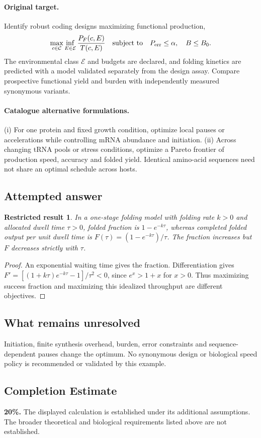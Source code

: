 \documentclass[11pt]{article}
\newtheorem{attemptresult}{Restricted result}[section]
\begin{document}
\paragraph{Original target.}
Identify robust coding designs maximizing functional production,
\[\max_{c\in\mathcal C}\inf_{E\in\mathcal E}\frac{P_F(c,E)}{T(c,E)}\quad\text{subject to}\quad P_{\rm err}\le\alpha,\quad B\le B_0.\]
The environmental class $\mathcal E$ and budgets are declared, and folding kinetics are predicted with a model validated separately from the design assay. Compare prospective functional yield and burden with independently measured synonymous variants.
\paragraph{Catalogue alternative formulations.}
(i) For one protein and fixed growth condition, optimize local pauses or accelerations while controlling mRNA abundance and initiation. (ii) Across changing tRNA pools or stress conditions, optimize a Pareto frontier of production speed, accuracy and folded yield. Identical amino-acid sequences need not share an optimal schedule across hosts.
\subsection{Attempted answer}
\begin{attemptresult}
In a one-stage folding model with folding rate $k>0$ and allocated dwell time $\tau>0$, folded fraction is $1-e^{-k\tau}$, whereas completed folded output per unit dwell time is $F(\tau)=(1-e^{-k\tau})/\tau$. The fraction increases but $F$ decreases strictly with $\tau$.
\end{attemptresult}
\begin{proof}
An exponential waiting time gives the fraction. Differentiation gives $F\prime=[(1+k\tau)e^{-k\tau}-1]/\tau^2<0$, since $e^x>1+x$ for $x>0$. Thus maximizing success fraction and maximizing this idealized throughput are different objectives.
\end{proof}
\subsection{What remains unresolved}
Initiation, finite synthesis overhead, burden, error constraints and sequence-dependent pauses change the optimum. No synonymous design or biological speed policy is recommended or validated by this example.
\subsection{Completion Estimate}
\textbf{20\%.} The displayed calculation is established under its additional assumptions. The broader theoretical and biological requirements listed above are not established.
\end{document}
